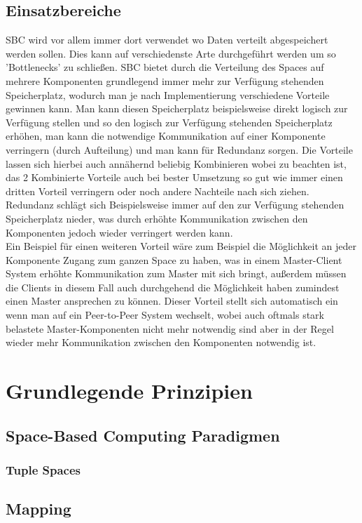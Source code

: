 \documentclass[a4paper,12pt]{scrreprt}
\begin{document}
	\section{Einsatzbereiche}
		SBC wird vor allem immer dort verwendet wo Daten verteilt abgespeichert werden sollen. Dies kann auf verschiedenste Arte durchgeführt werden um so 'Bottlenecks' %
		zu schließen. SBC bietet durch die Verteilung des Spaces auf mehrere Komponenten grundlegend immer mehr zur Verfügung stehenden Speicherplatz, wodurch man je nach Implementierung verschiedene Vorteile gewinnen kann. Man kann diesen Speicherplatz beispielsweise direkt logisch zur Verfügung stellen und so den logisch zur Verfügung stehenden Speicherplatz erhöhen, man kann die notwendige  Kommunikation auf einer Komponente verringern (durch Aufteilung) und man kann für Redundanz sorgen. Die Vorteile lassen sich hierbei auch annähernd beliebig Kombinieren wobei zu beachten ist, das 2 Kombinierte Vorteile auch bei bester Umsetzung so gut wie immer einen dritten Vorteil verringern oder noch andere Nachteile nach sich ziehen. Redundanz schlägt sich Beispielsweise immer auf den zur Verfügung stehenden Speicherplatz nieder, was durch erhöhte Kommunikation zwischen den Komponenten jedoch wieder verringert werden kann. \\    Ein Beispiel für einen weiteren Vorteil wäre zum Beispiel die Möglichkeit an jeder Komponente Zugang zum ganzen Space zu haben, was in einem Master-Client System erhöhte Kommunikation zum Master mit sich bringt, außerdem müssen die Clients in diesem Fall auch durchgehend die Möglichkeit haben zumindest einen Master ansprechen zu können. Dieser Vorteil stellt sich automatisch ein wenn man auf ein Peer-to-Peer System wechselt, wobei auch oftmals stark belastete Master-Komponenten nicht mehr notwendig sind aber in der Regel wieder mehr Kommunikation zwischen den Komponenten notwendig ist.
\chapter{Grundlegende Prinzipien}
	\section{Space-Based Computing Paradigmen}
		\subsection{Tuple Spaces}
			
		
	\section{Mapping}
		
\end{document}
